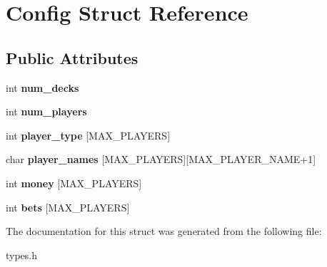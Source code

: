 \hypertarget{struct_config}{\section{Config Struct Reference}
\label{struct_config}
}
\subsection*{Public Attributes}
\begin{DoxyCompactItemize}
\item 
\hypertarget{struct_config_ab1484982a2e5451eff8c11e6388fee39}{int {\bfseries num\-\_\-decks}}\label{struct_config_ab1484982a2e5451eff8c11e6388fee39}

\item 
\hypertarget{struct_config_a1665c5cdf666e1c2f801c9df0cace11e}{int {\bfseries num\-\_\-players}}\label{struct_config_a1665c5cdf666e1c2f801c9df0cace11e}

\item 
\hypertarget{struct_config_aae8c9d106a2886f8e50fc678b14578a8}{int {\bfseries player\-\_\-type} \mbox{[}M\-A\-X\-\_\-\-P\-L\-A\-Y\-E\-R\-S\mbox{]}}\label{struct_config_aae8c9d106a2886f8e50fc678b14578a8}

\item 
\hypertarget{struct_config_a88dbc74a702cd0b6e6ae1bc32b7228ca}{char {\bfseries player\-\_\-names} \mbox{[}M\-A\-X\-\_\-\-P\-L\-A\-Y\-E\-R\-S\mbox{]}\mbox{[}M\-A\-X\-\_\-\-P\-L\-A\-Y\-E\-R\-\_\-\-N\-A\-M\-E+1\mbox{]}}\label{struct_config_a88dbc74a702cd0b6e6ae1bc32b7228ca}

\item 
\hypertarget{struct_config_a8c4fb8a053d999cf24e10daca50dcd86}{int {\bfseries money} \mbox{[}M\-A\-X\-\_\-\-P\-L\-A\-Y\-E\-R\-S\mbox{]}}\label{struct_config_a8c4fb8a053d999cf24e10daca50dcd86}

\item 
\hypertarget{struct_config_a990539a3e25d09fc9ca7f090b2f62d36}{int {\bfseries bets} \mbox{[}M\-A\-X\-\_\-\-P\-L\-A\-Y\-E\-R\-S\mbox{]}}\label{struct_config_a990539a3e25d09fc9ca7f090b2f62d36}

\end{DoxyCompactItemize}


The documentation for this struct was generated from the following file\-:\begin{DoxyCompactItemize}
\item 
types.\-h\end{DoxyCompactItemize}

